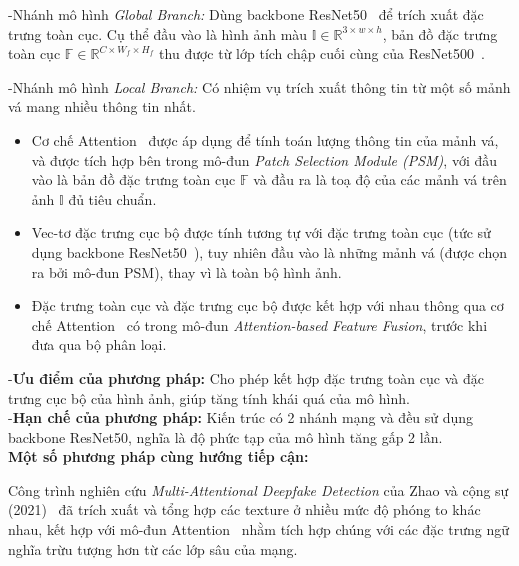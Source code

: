 -Nhánh mô hình \textit{Global Branch:} 
%
Dùng \gls{backbone} ResNet50~\cite{He2015DeepRL} để trích xuất đặc trưng toàn cục. Cụ thể đầu vào là hình ảnh màu $\mathbb{I} \in \mathbb{R}^{3 \times w \times h}$, bản đồ đặc trưng toàn cục $\mathbb{F} \in \mathbb{R}^{C \times W_f \times H_f}$ thu được từ lớp tích chập cuối cùng của ResNet500~\cite{He2015DeepRL}.

-Nhánh mô hình \textit{Local Branch:} Có nhiệm vụ trích xuất thông tin từ một số mảnh vá mang nhiều thông tin nhất.

\begin{itemize}
	\item Cơ chế Attention~\cite{Vaswani2017AttentionIA} được áp dụng để tính toán lượng thông tin của mảnh vá, và được tích hợp bên trong mô-đun \textit{Patch Selection Module (PSM)}, với đầu vào là bản đồ đặc trưng toàn cục $\mathbb{F}$ và đầu ra là toạ độ của các mảnh vá trên ảnh $\mathbb{I}$ đủ tiêu chuẩn.
	\item Vec-tơ đặc trưng cục bộ được tính tương tự với đặc trưng toàn cục (tức sử dụng \gls{backbone} ResNet50~\cite{He2015DeepRL}), tuy nhiên đầu vào là những mảnh vá (được chọn ra bởi mô-đun PSM), thay vì là toàn bộ hình ảnh.
	\item Đặc trưng toàn cục và đặc trưng cục bộ được kết hợp với nhau thông qua cơ chế Attention~\cite{Vaswani2017AttentionIA} có trong mô-đun \textit{Attention-based Feature Fusion}, trước khi đưa qua bộ phân loại.
\end{itemize}
%
-\textbf{Ưu điểm của phương pháp:}
%
Cho phép kết hợp đặc trưng toàn cục và đặc trưng cục bộ của hình ảnh, giúp tăng tính khái quá của mô hình.\\
%
-\textbf{Hạn chế của phương pháp:}
Kiến trúc có 2 nhánh mạng và đều sử dụng \gls{backbone} ResNet50, nghĩa là độ phức tạp của mô hình tăng gấp 2 lần.\\
%
\textbf{Một số phương pháp cùng hướng tiếp cận:}
%

Công trình nghiên cứu \textit{Multi-Attentional Deepfake Detection} của Zhao và cộng sự (2021)~\cite{Zhao_2021_CVPR} đã trích xuất và tổng hợp các \gls{texture} ở nhiều mức độ phóng to khác nhau, kết hợp với mô-đun Attention~\cite{Vaswani2017AttentionIA} nhằm tích hợp chúng với các đặc trưng ngữ nghĩa trừu tượng hơn từ các lớp sâu của mạng.

